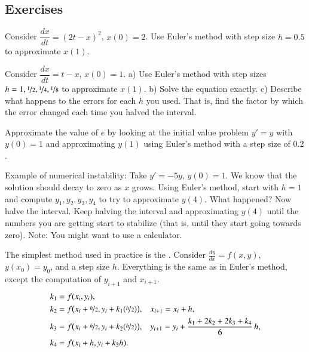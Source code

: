 \documentclass[12pt]{book}
\begin{document}
\subsection{Exercises}

\begin{exercise}
Consider $\dfrac{dx}{dt} = {(2t-x)}^2$, $x(0)=2$.  Use Euler's method
with step size $h=0.5$ to approximate $x(1)$.
\end{exercise}

\begin{exercise}
Consider $\dfrac{dx}{dt} = t-x$, $x(0)=1$.  a) Use Euler's method
with step sizes $h = 1, \nicefrac{1}{2}, \nicefrac{1}{4}, \nicefrac{1}{8}$ to
approximate
$x(1)$.  b) Solve the equation exactly.
c) Describe what happens to the
errors for each $h$ you used.  That is, find the factor by which the error
changed each time you halved the interval.
\end{exercise}

\begin{exercise}
Approximate the value of $e$ by looking at the initial value problem
$y'=y$ with $y(0)=1$ and approximating $y(1)$ using Euler's method with
a step size of $0.2$.
\end{exercise}

\begin{exercise}
Example of numerical instability:
Take $y' = -5y$, $y(0) = 1$.  We know that the
solution should decay to zero as $x$ grows.
Using Euler's method, start with $h=1$ and compute
$y_1, y_2, y_3, y_4$ to try to approximate $y(4)$.  What happened?
Now halve the interval.  Keep halving the interval and approximating $y(4)$
until the numbers you are getting
start to stabilize (that is, until they start going towards zero).
Note: You might want to use a calculator.
\end{exercise}

The simplest method used in practice is the
\emph{}.
Consider $\frac{dy}{dx}=f(x,y)$, $y(x_0) = y_0$,
and a step size $h$.  Everything is the same as in Euler's method, except
the computation of $y_{i+1}$ and $x_{i+1}$.
\begin{align*}
& k_1 = f(x_i,y_i) , & & \\
& k_2 = f\bigl(x_i + \nicefrac{h}{2},y_i + k_1 (\nicefrac{h}{2})\bigr) ,
& & 
x_{i+1} = x_i + h , \\
& k_3 = f\bigl(x_i + \nicefrac{h}{2},y_i + k_2 (\nicefrac{h}{2})\bigr) ,
& &
y_{i+1} = y_i + \frac{k_1 + 2k_2 + 2k_3 + k_4}{6}\,h ,  \\
& k_4 = f(x_i + h,y_i + k_3 h) .
\end{align*}
\end{document}
